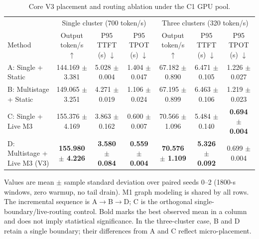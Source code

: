 \begin{table}[t]
\caption{Core V3 placement and routing ablation under the C1 GPU pool.}
\label{tab:v3-core-ablation}
\centering
\footnotesize
\setlength{\tabcolsep}{3pt}
\begin{tabular}{@{}lccc@{\hspace{0.65em}\vrule\hspace{0.65em}}ccc@{}}
\toprule
 & \multicolumn{3}{c}{Single cluster (700 token/s)} & \multicolumn{3}{c}{Three clusters (320 token/s)} \\
\cmidrule(lr){2-4}\cmidrule(l){5-7}
Method & \shortstack{Output\\token/s $\uparrow$} & \shortstack{P95 TTFT\\(s) $\downarrow$} & \shortstack{P95 TPOT\\(s) $\downarrow$} & \shortstack{Output\\token/s $\uparrow$} & \shortstack{P95 TTFT\\(s) $\downarrow$} & \shortstack{P95 TPOT\\(s) $\downarrow$} \\
\midrule
A: Single + Static & 144.169 $\pm$ 3.381 & 5.028 $\pm$ 0.004 & 1.404 $\pm$ 0.047 & 67.182 $\pm$ 0.890 & 6.471 $\pm$ 0.105 & 1.226 $\pm$ 0.027 \\
B: Multistage + Static & 149.065 $\pm$ 3.251 & 4.271 $\pm$ 0.019 & 1.106 $\pm$ 0.024 & 67.195 $\pm$ 0.899 & 6.463 $\pm$ 0.106 & 1.219 $\pm$ 0.023 \\
C: Single + Live M3 & 155.376 $\pm$ 4.169 & 3.863 $\pm$ 0.162 & 0.600 $\pm$ 0.007 & 70.566 $\pm$ 1.096 & 5.484 $\pm$ 0.140 & \textbf{0.694 $\pm$ 0.004} \\
D: Multistage + Live M3 (V3) & \textbf{155.980 $\pm$ 4.226} & \textbf{3.580 $\pm$ 0.084} & \textbf{0.559 $\pm$ 0.004} & \textbf{70.576 $\pm$ 1.109} & \textbf{5.326 $\pm$ 0.092} & 0.699 $\pm$ 0.004 \\
\bottomrule
\end{tabular}
\vspace{2pt}
\parbox{\textwidth}{\footnotesize Values are mean $\pm$ sample standard deviation over paired seeds 0--2 (1800-s windows, zero warmup, no tail drain). M1 graph modeling is shared by all rows. The incremental sequence is A$\rightarrow$B$\rightarrow$D; C is the orthogonal single-boundary/live-routing control. Bold marks the best observed mean in a column and does not imply statistical significance. In the three-cluster case, B and D retain a single boundary; their differences from A and C reflect micro-placement.}
\end{table}
